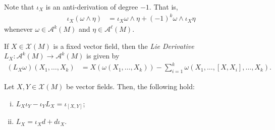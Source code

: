 \documentclass[10pt]{mypackage}
\begin{document}
Note that $\iota_X$ is an anti-derivation of degree $-1$. That is,
\begin{align*}
  \iota_X\left( \omega\wedge\eta \right) &= \iota_X\omega\wedge\eta + \left( -1 \right)^{k}\omega\wedge \iota_{X}\eta
\end{align*}
whenever $\omega\in \mathcal{A}^{k}\left( M \right)$ and $\eta\in \mathcal{A}^{\ell}\left( M \right)$.
\begin{definition}
  If $X\in \mathcal{X}\left( M \right)$ is a fixed vector field, then the \textit{Lie Derivative} $L_X\colon \mathcal{A}^{k}\left( M \right)\rightarrow \mathcal{A}^{k}\left( M \right)$ is given by
  \begin{align*}
    \left( L_X\omega \right)\left( X_1,\dots,X_k \right) &= X\left( \omega\left( X_1,\dots,X_k \right) \right) - \sum_{i=1}^{k}\omega\left( X_1,\dots,\left[ X,X_i \right],\dots,X_k \right).
  \end{align*}
\end{definition}
\begin{proposition}
  Let $X,Y\in \mathcal{X}\left( M \right)$ be vector fields. Then, the following hold:
  \begin{enumerate}[(i)]
    \item $L_X\iota_Y - \iota_YL_X = \iota_{\left[ X,Y \right]}$;
    \item $L_X = \iota_X d + d \iota_X$.
  \end{enumerate}
\end{proposition}
\end{document}
